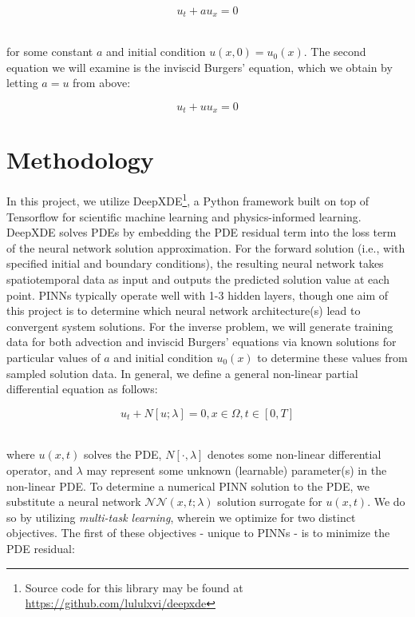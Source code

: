 \documentclass[letterpaper,12pt]{article}
\begin{document}
    $$
    u_t + a u_x = 0
    $$

    \ \\
    \noindent for some constant $a$ and initial condition $u(x, 0) = u_0(x)$. The second equation we will examine is the
    inviscid Burgers' equation, which we obtain by letting $a = u$ from above:

    $$
    u_t + u u_x = 0
    $$

    \section{Methodology}\label{sec:proposed-methodology}

    In this project, we utilize DeepXDE\footnote{
        Source code for this library may be found at
        \hyperlink{https://github.com/lululxvi/deepxde}{https://github.com/lululxvi/deepxde}
    }, a Python framework built on top of Tensorflow for scientific machine learning and physics-informed 
    learning.\cite{lu_deepxde_2021} DeepXDE solves PDEs by embedding the PDE residual term into the loss term of the
    neural network solution approximation. For the forward solution (i.e., with specified initial and boundary 
    conditions), the resulting neural network takes spatiotemporal data as input and outputs the predicted solution 
    value at each point. PINNs typically operate well with 1-3 hidden layers, though one aim of this project is to 
    determine which neural network architecture(s) lead to convergent system solutions. For the inverse problem, we will
    generate training data for both advection and inviscid Burgers' equations via known solutions for particular values
    of $a$ and initial condition $u_0(x)$ to determine these values from sampled solution data. In general, we 
    define a general non-linear partial differential equation as follows:

    $$
    u_t + N[u; \lambda] = 0, x \in \Omega, t \in [0, T]
    $$

    \ \\
    \noindent where $u(x, t)$ solves the PDE, $N[\cdot, \lambda]$ denotes some non-linear differential operator, and 
    $\lambda$ may represent some unknown (learnable) parameter(s) in the non-linear PDE. To determine a numerical PINN 
    solution to the PDE, we substitute a neural network $\mathcal{NN}(x, t; \lambda)$ solution surrogate for $u(x, t)$. 
    We do so by utilizing \textit{multi-task learning}, wherein we optimize for two distinct objectives. The first of 
    these objectives - unique to PINNs - is to minimize the PDE residual:
\end{document}
